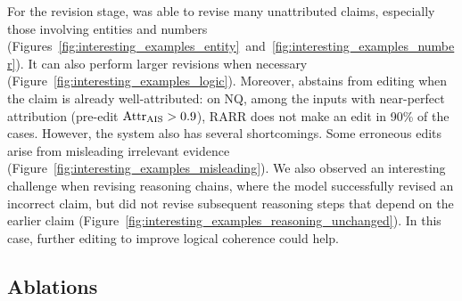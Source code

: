 \documentclass[11pt]{article}
\begin{document}
For the revision stage,
\approach{} was able to revise many unattributed claims, especially those involving entities and numbers (Figures~\ref{fig:interesting_examples_entity}~and~\ref{fig:interesting_examples_number}).
It can also perform larger revisions when necessary (Figure~\ref{fig:interesting_examples_logic}).
Moreover, \approach{} abstains from editing when the claim is already well-attributed:
on NQ, among the inputs with near-perfect attribution (pre-edit $\text{Attr}_\text{AIS}{} > 0.9$), RARR does not make an edit in 90\% of the cases.
However, the system also has several shortcomings.
Some erroneous edits arise from %
misleading irrelevant evidence (Figure~\ref{fig:interesting_examples_misleading}).
We also observed an interesting challenge when revising reasoning chains, %
where the model successfully revised an incorrect claim, but did not revise subsequent reasoning steps that depend on the earlier claim (Figure~\ref{fig:interesting_examples_reasoning_unchanged}). In this case, further editing to improve logical coherence could help.

\subsection{Ablations} \label{sec:ablations}
\end{document}
